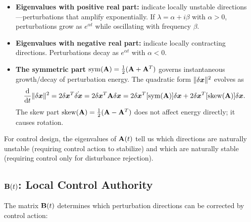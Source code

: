 \begin{itemize}
\item \textbf{Eigenvalues with positive real part:} indicate locally unstable directions---perturbations
      that amplify exponentially. If $\lambda = \alpha + i\beta$ with $\alpha > 0$, perturbations grow
      as $e^{\alpha t}$ while oscillating with frequency $\beta$.

\item \textbf{Eigenvalues with negative real part:} indicate locally contracting directions. Perturbations
      decay as $e^{\alpha t}$ with $\alpha < 0$.

\item \textbf{The symmetric part} $\operatorname{sym}(\mathbf{A}) = \frac{1}{2}(\mathbf{A}+\mathbf{A}^T)$ governs instantaneous
      growth/decay of perturbation energy. The quadratic form $\|\delta\bm{x}\|^2$ evolves as
      \begin{equation}
      \frac{\mathrm{d}}{\mathrm{d} t}\|\delta\bm{x}\|^2 = 2\delta\bm{x}^T\dot{\delta\bm{x}} = 2\delta\bm{x}^T\mathbf{A}\delta\bm{x} = 2\delta\bm{x}^T[\operatorname{sym}(\mathbf{A})]\delta\bm{x} + 2\delta\bm{x}^T[\operatorname{skew}(\mathbf{A})]\delta\bm{x}.
      \end{equation}
      The skew part $\operatorname{skew}(\mathbf{A}) = \frac{1}{2}(\mathbf{A}-\mathbf{A}^T)$ does not affect energy directly; it causes rotation.
\end{itemize}

For control design, the eigenvalues of $\mathbf{A}(t)$ tell us which directions are naturally unstable (requiring
control action to stabilize) and which are naturally stable (requiring control only for disturbance rejection).

\subsection{$\mathbf{B}(t)$: Local Control Authority}

The matrix $\mathbf{B}(t)$ determines which perturbation directions can be corrected by control action:

